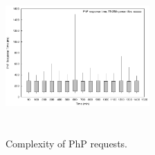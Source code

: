 \begin{figure}
\begin{center}
\includegraphics[width=0.49\textwidth, height=6cm]{./images/phpRespTimeDispersion}
\end{center}
\vspace{-5mm}
\caption{Complexity of PhP requests.}
\label{phpRespTimeDispersion}
\end{figure}









